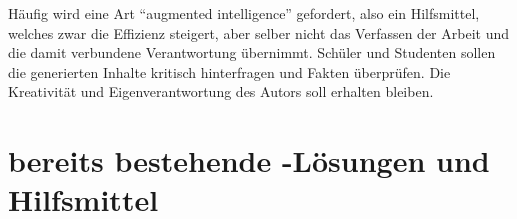 \documentclass[../main.tex]{subfiles}
\begin{document}
Häufig wird eine Art "`augmented intelligence"' gefordert, also ein Hilfsmittel, welches zwar die Effizienz steigert, aber selber nicht das Verfassen der 
Arbeit und die damit verbundene Verantwortung übernimmt. Schüler und Studenten sollen die generierten Inhalte kritisch hinterfragen und Fakten überprüfen. Die Kreativität und 
Eigenverantwortung des Autors soll erhalten bleiben.\cite{BucherSchwarzerHolzwweißig,humanWritingToAi,teachers,ZukunftWissenschaftlichesPublizieren} 

\section{bereits bestehende -Lösungen und Hilfsmittel}
\end{document}
